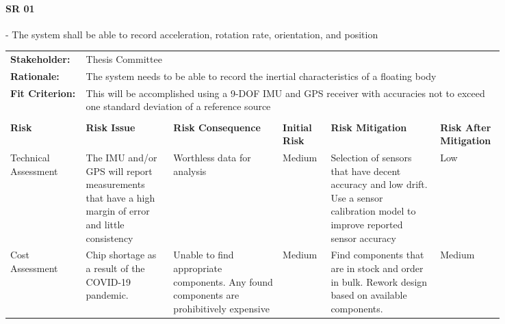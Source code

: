 \begin{landscape}
\paragraph*{SR 01} - The system shall be able to record acceleration, rotation rate, orientation, and position

{\fontsize{8pt}{8pt}\selectfont
\begin{longtable}{| p{0.12\linewidth} | p{0.16\linewidth} |  p{0.20\linewidth} | p{0.08\linewidth} | p{0.20\linewidth} | p{0.08\linewidth} |}
	\hline \endlastfoot
	
	\hline
	\rowcolor[gray]{0.8}
	\multicolumn{6}{|c|}{ } \\
	\hline
	\textbf{Stakeholder:} & \multicolumn{5}{|l|}{Thesis Committee} \\
	\hline
	\textbf{Rationale:} & \multicolumn{5}{|p{0.8\linewidth}|}{The system needs to be able to record the inertial characteristics of a floating body} \\
	\hline
	\textbf{Fit Criterion:} & \multicolumn{5}{|p{0.8\linewidth}|}{This will be accomplished using a 9-DOF IMU and GPS receiver with accuracies not to exceed one standard deviation of a reference source} \\
	\hline
	\rowcolor[gray]{0.8}
	\multicolumn{6}{|c|}{ } \\
	\hline
	\textbf{Risk} & \textbf{Risk Issue} & \textbf{Risk Consequence} & \textbf{Initial Risk} & \textbf{Risk Mitigation} & \textbf{Risk \newline After \newline Mitigation} \\
	\hline
	Technical \newline Assessment & The IMU and/or GPS will report measurements that have a high margin of error and little consistency & Worthless data for analysis & \cellcolor{yellow} Medium & Selection of sensors that have decent accuracy and low drift. \newline Use a sensor calibration model to improve reported sensor accuracy & \cellcolor{green} Low \\
	\hline
	Cost \newline Assessment & Chip shortage as a result of the COVID-19 pandemic. & Unable to find appropriate components. \newline Any found components are prohibitively expensive & \cellcolor{yellow} Medium & Find components that are in stock and order in bulk. \newline Rework design based on available components. & \cellcolor{yellow} Medium \\

\end{longtable}}
\end{landscape}
